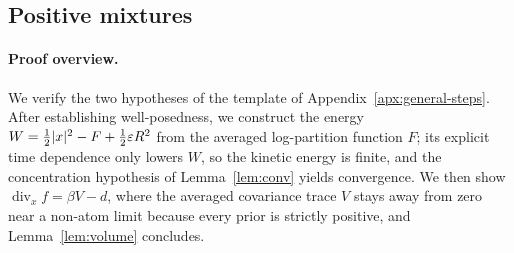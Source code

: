 \documentclass{article} %
\theoremstyle{plain}
\theoremstyle{definition}
\theoremstyle{remark}
\begin{document}
\subsection{Positive mixtures}
\label{apx:pf-posmix}

\thmposmix*
\paragraph{Proof overview.} We verify the two hypotheses of the template of
Appendix~\ref{apx:general-steps}. After establishing well-posedness, we construct the energy
$W=\tfrac12|x|^2-F+\tfrac12\varepsilon R^2$ from the averaged log-partition function $F$; its explicit
time dependence only lowers $W$, so the kinetic energy is finite, and the concentration hypothesis
of Lemma~\ref{lem:conv} yields convergence. We then show $\operatorname{div}_xf=\beta V-d$, where
the averaged covariance trace $V$ stays away from zero near a non-atom limit because every prior is
strictly positive, and Lemma~\ref{lem:volume} concludes.
\end{document}
